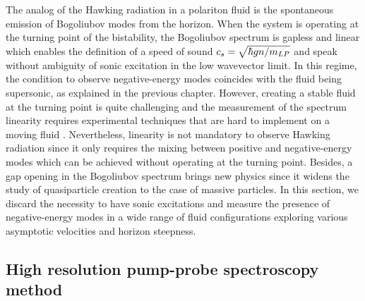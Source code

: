 The analog of the Hawking radiation in a polariton fluid is the spontaneous emission of Bogoliubov modes from the horizon. When the system is operating at the turning point of the bistability, the Bogoliubov spectrum 
is gapless and linear which enables the definition of a speed of sound $c_s = \sqrt{\hbar g n /m_{LP}}$ and speak without ambiguity of sonic excitation in the low wavevector limit. In this regime, the condition to observe negative-energy modes coincides with the fluid being supersonic, as explained in the previous chapter. 
However, creating a stable fluid at the turning point is quite challenging and the measurement of the spectrum linearity requires experimental techniques that are hard to implement on a moving fluid \cite{claude_phd}. Nevertheless, linearity is not mandatory to observe Hawking radiation since 
it only requires the mixing between positive and negative-energy modes which can be achieved without operating at the turning point. Besides, a gap opening in the Bogoliubov spectrum brings new physics since it widens the study of quasiparticle creation to the case of massive particles. In this
section, we discard the necessity to have sonic excitations and measure the presence of negative-energy modes in a wide range of fluid configurations exploring various asymptotic velocities and horizon steepness.




\subsection{High resolution pump-probe spectroscopy method}



